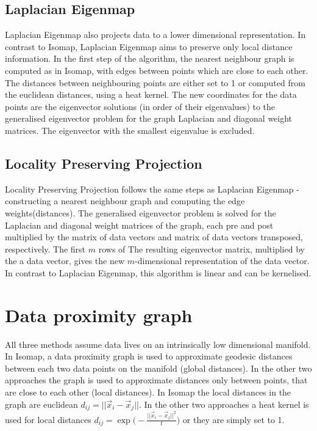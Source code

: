 \documentclass[a4paper, 11pt]{article}
\begin{document}
\subsection{Laplacian Eigenmap}
Laplacian Eigenmap \cite{Belkin2003} also projects data to a lower dimensional representation. In contrast to Isomap, Laplacian Eigenmap aims to preserve only local distance information. In the first step of the algorithm, the nearest neighbour graph is computed as in Isomap, with edges between points which are close to each other. The distances between neighbouring points are either set to 1 or computed from the euclidean distances, using a heat kernel. The new coordinates for the data points are the eigenvector solutions (in order of their eigenvalues) to the generalised eigenvector problem for the graph Laplacian and diagonal weight matrices. The eigenvector with the smallest eigenvalue is excluded. 


\subsection{Locality Preserving Projection}
Locality Preserving Projection \cite{Xiaofei2005} follows the same steps as Laplacian Eigenmap - constructing a nearest neighbour graph and computing the edge weights(distances). The generalised eigenvector problem is solved for the Laplacian and diagonal weight matrices of the graph, each pre and post multiplied by the matrix of data vectors and matrix of data vectors transposed, respectively. The first $m$ rows of The resulting eigenvector matrix, multiplied by the a data vector, gives the new $m$-dimensional representation of the data vector. In contrast to Laplacian Eigenmap, this algorithm is linear and can be kernelised.


\section{Data proximity graph}
All three methods assume data lives on an intrinsically low dimensional manifold. In Isomap, a data proximity graph is used to approximate geodesic distances between each two data points on the manifold (global distances). In the other two approaches the graph is used to approximate distances only between points, that are close to each other (local distances). In Isomap the local distances in the graph are euclidean $d_{ij} = ||\vec{x}_i - \vec{x}_j||$. In the other two approaches a heat kernel is used for local distances $d_{ij} = \exp{\Big(-\frac{||\vec{x}_i - \vec{x}_j||^2}{t}	\Big)}$ or they are simply set to 1.
\end{document}
